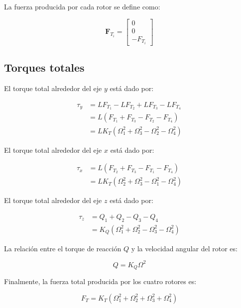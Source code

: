 \documentclass[11pt,a4paper]{article}
\begin{document}
La fuerza producida por cada rotor se define como:

\begin{equation}
\mathbf{F}_{T_i} =
\begin{bmatrix}
0 \\
0 \\
-F_{T_i}
\end{bmatrix}
\end{equation}


\subsection{Torques totales}

El torque total alrededor del eje $y$ está dado por:

\begin{align}
\tau_y
&= L F_{T_1} - L F_{T_2} + L F_{T_3} - L F_{T_4} \\
&= L\left(
F_{T_1} + F_{T_3}
- F_{T_2} - F_{T_4}
\right) \\
&= L K_T\left(
\Omega_1^2 + \Omega_3^2
- \Omega_2^2 - \Omega_4^2
\right)
\end{align}


El torque total alrededor del eje $x$ está dado por:

\begin{align}
\tau_x
&= L\left(
F_{T_2} + F_{T_3}
- F_{T_1} - F_{T_4}
\right) \\
&= L K_T\left(
\Omega_2^2 + \Omega_3^2
- \Omega_1^2 - \Omega_4^2
\right)
\end{align}


El torque total alrededor del eje $z$ está dado por:

\begin{align}
\tau_z
&= Q_1 + Q_2 - Q_3 - Q_4 \\
&= K_Q\left(
\Omega_1^2 + \Omega_2^2
- \Omega_3^2 - \Omega_4^2
\right)
\end{align}


La relación entre el torque de reacción $Q$ y la velocidad angular del rotor es:

\begin{equation}
Q = K_Q \Omega^2
\end{equation}


Finalmente, la fuerza total producida por los cuatro rotores es:

\begin{equation}
F_T =
K_T\left(
\Omega_1^2 + \Omega_2^2
+ \Omega_3^2 + \Omega_4^2
\right)
\end{equation}
\end{document}
